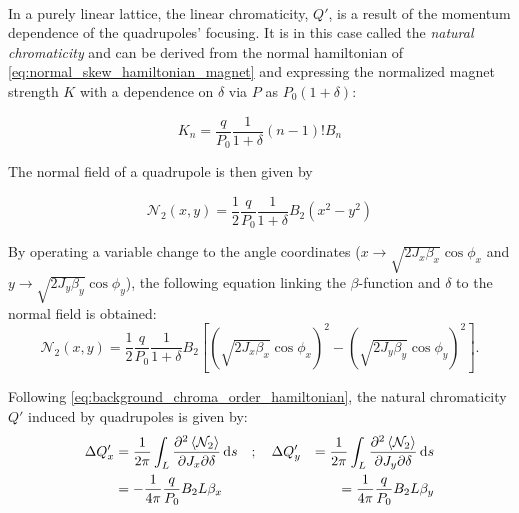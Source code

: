\paragraph{}

In a purely linear lattice, the linear chromaticity, $Q'$, is a result of the momentum dependence 
of the quadrupoles' focusing. It is in this case called the \textit{natural chromaticity} and can be
derived from the normal hamiltonian of \cref{eq:normal_skew_hamiltonian_magnet} and expressing
the normalized magnet strength $K$ with a dependence on $\delta$ via $P$ as $P_0(1+\delta)$:

\begin{equation}
    K_n = \frac{q}{P_0} \frac{1}{1 + \delta} (n - 1)! B_n
    \label{eq:k_dpp}
\end{equation}

The normal field of a quadrupole is then given by

\begin{equation}
    \mathcal{N}_2(x,y) = \frac{1}{2} \frac{q}{P_0} \frac{1}{1+\delta} B_2 (x^2 - y^2)
\end{equation}

By operating a variable change to the angle coordinates 
(\(x \rightarrow \sqrt{2 J_x \beta_x} \cos \phi_x\) and
\(y \rightarrow \sqrt{2 J_y \beta_y} \cos \phi_y\)), the following equation linking the $\beta$-function
and $\delta$ to the normal field is obtained:
\begin{equation}\mathcal{N}_2 (x,y) = \frac{1}{2} \frac{q}{P_0} \frac{1}{1+\delta} B_2 
        \left[
            \left(\sqrt{2 J_x \beta_x} \cos \phi_x \right)^2 
            - \left(\sqrt{2 J_y \beta_y} \cos \phi_y\right)^2
        \right].
    \label{eq:hamiltonian_quadrupole_angle}
\end{equation}

Following \cref{eq:background_chroma_order_hamiltonian}, the natural chromaticity $Q'$ induced by
quadrupoles is given by:
\begin{equation}
    \begin{aligned}
        \Delta Q'_x &= \frac{1}{2\pi} \int_L \frac{\partial^2 \left< \mathcal{N}_2 \right> }{\partial J_x \partial \delta} \mathop{}\!\mathrm{d} s
        \quad;\quad
        \Delta Q'_y &= \frac{1}{2\pi} \int_L \frac{\partial^2 \left< \mathcal{N}_2 \right>}{\partial J_y \partial \delta} \mathop{}\!\mathrm{d} s
        \\
        & = - \frac{1}{4 \pi} \frac{q}{P_0} B_2 L \beta_x
        & = \frac{1}{4 \pi} \frac{q}{P_0} B_2 L \beta_y
    \end{aligned}
\end{equation}


